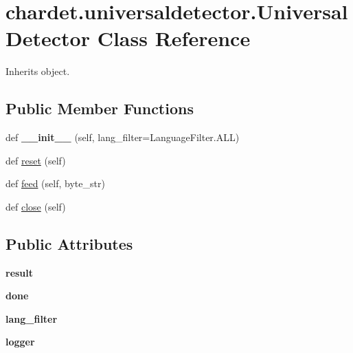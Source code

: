 \hypertarget{classchardet_1_1universaldetector_1_1_universal_detector}{}\section{chardet.\+universaldetector.\+Universal\+Detector Class Reference}
\label{classchardet_1_1universaldetector_1_1_universal_detector}


Inherits object.

\subsection*{Public Member Functions}
\begin{DoxyCompactItemize}
\item 
\mbox{\label{classchardet_1_1universaldetector_1_1_universal_detector_a719a60d7ad9353b87154661d0c774119}} 
def {\bfseries \+\_\+\+\_\+init\+\_\+\+\_\+} (self, lang\+\_\+filter=Language\+Filter.\+A\+LL)
\item 
def \hyperlink{classchardet_1_1universaldetector_1_1_universal_detector_acb3d3ab019d663f32a612df4752b315d}{reset} (self)
\item 
def \hyperlink{classchardet_1_1universaldetector_1_1_universal_detector_a2d4e353e650db43bce8689fbb18464c5}{feed} (self, byte\+\_\+str)
\item 
def \hyperlink{classchardet_1_1universaldetector_1_1_universal_detector_ad90ae39690b24a154988a1dfacee0bf8}{close} (self)
\end{DoxyCompactItemize}
\subsection*{Public Attributes}
\begin{DoxyCompactItemize}
\item 
\mbox{\label{classchardet_1_1universaldetector_1_1_universal_detector_af574226a668da064ee0cf231b9fd6ed3}} 
{\bfseries result}
\item 
\mbox{\label{classchardet_1_1universaldetector_1_1_universal_detector_ada751a7fea51c68f050b6b925bf3bda1}} 
{\bfseries done}
\item 
\mbox{\label{classchardet_1_1universaldetector_1_1_universal_detector_a97169b50225e4141e6c32a9ea7d70eb0}} 
{\bfseries lang\+\_\+filter}
\item 
\mbox{\label{classchardet_1_1universaldetector_1_1_universal_detector_a3e018d972dafcfe82ddd3c8c891eea77}} 
{\bfseries logger}
\end{DoxyCompactItemize}
